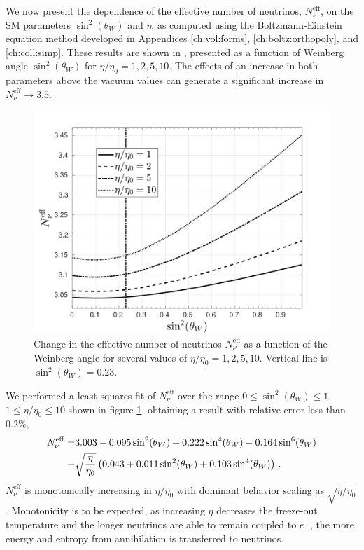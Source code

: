 We now present the dependence of the effective number of neutrinos, $N_\nu^{\mathrm{eff}}$, on the SM parameters $\sin^2(\theta_W)$ and $\eta$, as computed using the Boltzmann-Einstein equation method developed in Appendices \ref{ch:vol:forms}, \ref{ch:boltz:orthopoly}, and \ref{ch:coll:simp}. These results are shown in , presented as a function of Weinberg angle $\sin^2(\theta_W) $ for $\eta/\eta_0=1,2,5,10$. The effects of an increase in both parameters above the vacuum values can generate a significant increase in $N_\nu^{\mathrm{eff}}\to 3.5$.
\begin{figure}
\centerline{\includegraphics[width=0.90\linewidth]{plots/N_eff2.pdf}}
\caption{Change in the effective number of neutrinos $N_\nu^{\mathrm{eff}}$ as a function of the Weinberg angle for several values of $\eta/\eta_0=1,2,5,10$. Vertical line is $\sin^2(\theta_W)=0.23$. }
\label{NnuParams} 
 \end{figure}

We performed a least-squares fit of $N_\nu^{\mathrm{eff}}$ over the range $0\leq \sin^2(\theta_W)\leq 1$, $1\leq \eta/\eta_0\leq 10$ shown in figure \ref{NnuParams}, obtaining a result with relative error less than $0.2\%$,
\begin{align}
N_\nu^{\mathrm{eff}}=&3.003-0.095\sin^2(\theta_W) +0.222\sin^4(\theta_W ) -0.164\sin^6(\theta_W )\notag\\
+&\sqrt{\frac{\eta}{\eta_0}}\left(0.043+0.011\sin^2(\theta_W) +0.103\sin^4(\theta_W)\right)\,.
\end{align}
$N_\nu^{\mathrm{eff}}$ is monotonically increasing in $\eta/\eta_0$ with dominant behavior scaling as $\sqrt{ \eta/\eta_0}$. Monotonicity is to be expected, as increasing $\eta$ decreases the freeze-out temperature and the longer neutrinos are able to remain coupled to $e^\pm$, the more energy and entropy from annihilation is transferred to neutrinos.

